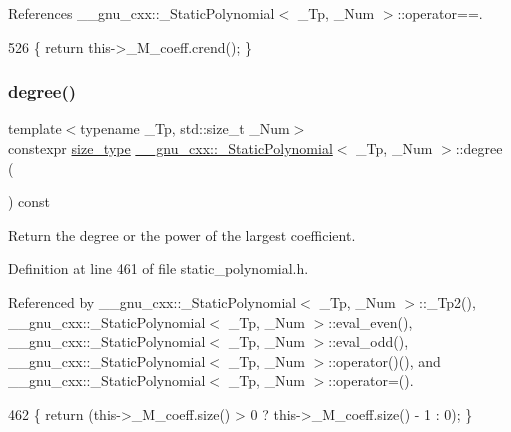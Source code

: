 References \+\_\+\+\_\+gnu\+\_\+cxx\+::\+\_\+\+Static\+Polynomial$<$ \+\_\+\+Tp, \+\_\+\+Num $>$\+::operator==.


\begin{DoxyCode}
526       \{ \textcolor{keywordflow}{return} this->\_M\_coeff.crend(); \}
\end{DoxyCode}
\mbox{\label{class____gnu__cxx_1_1__StaticPolynomial_a56b1719601ce049e6dd768e10edfd171}} 
\subsubsection{\texorpdfstring{degree()}{degree()}}
{\footnotesize\ttfamily template$<$typename \+\_\+\+Tp, std\+::size\+\_\+t \+\_\+\+Num$>$ \\
constexpr \hyperlink{class____gnu__cxx_1_1__StaticPolynomial_a3384ce6a956ad398fc995e6ee53b2b18}{size\+\_\+type} \hyperlink{class____gnu__cxx_1_1__StaticPolynomial}{\+\_\+\+\_\+gnu\+\_\+cxx\+::\+\_\+\+Static\+Polynomial}$<$ \+\_\+\+Tp, \+\_\+\+Num $>$\+::degree (\begin{DoxyParamCaption}{ }\end{DoxyParamCaption}) const\hspace{0.3cm}{\ttfamily [inline]}}

Return the degree or the power of the largest coefficient. 

Definition at line 461 of file static\+\_\+polynomial.\+h.



Referenced by \+\_\+\+\_\+gnu\+\_\+cxx\+::\+\_\+\+Static\+Polynomial$<$ \+\_\+\+Tp, \+\_\+\+Num $>$\+::\+\_\+\+Tp2(), \+\_\+\+\_\+gnu\+\_\+cxx\+::\+\_\+\+Static\+Polynomial$<$ \+\_\+\+Tp, \+\_\+\+Num $>$\+::eval\+\_\+even(), \+\_\+\+\_\+gnu\+\_\+cxx\+::\+\_\+\+Static\+Polynomial$<$ \+\_\+\+Tp, \+\_\+\+Num $>$\+::eval\+\_\+odd(), \+\_\+\+\_\+gnu\+\_\+cxx\+::\+\_\+\+Static\+Polynomial$<$ \+\_\+\+Tp, \+\_\+\+Num $>$\+::operator()(), and \+\_\+\+\_\+gnu\+\_\+cxx\+::\+\_\+\+Static\+Polynomial$<$ \+\_\+\+Tp, \+\_\+\+Num $>$\+::operator=().


\begin{DoxyCode}
462       \{ \textcolor{keywordflow}{return} (this->\_M\_coeff.size() > 0 ? this->\_M\_coeff.size() - 1 : 0); \}
\end{DoxyCode}
\mbox{\label{class____gnu__cxx_1_1__StaticPolynomial_a1a6609525fd6acb2d277d32f6999d925}} 
